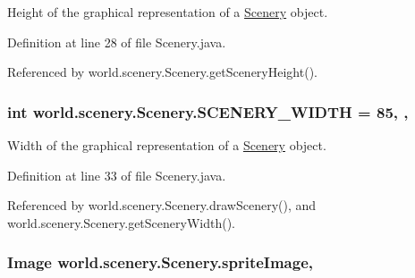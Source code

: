 Height of the graphical representation of a \hyperlink{classworld_1_1scenery_1_1_scenery}{Scenery} object. 



Definition at line 28 of file Scenery.\-java.



Referenced by world.\-scenery.\-Scenery.\-get\-Scenery\-Height().

\hypertarget{classworld_1_1scenery_1_1_scenery_affb047c028883c6d069a03ef0f1caeb8}{
\subsubsection[{S\-C\-E\-N\-E\-R\-Y\-\_\-\-W\-I\-D\-T\-H}]{\setlength{\rightskip}{0pt plus 5cm}int world.\-scenery.\-Scenery.\-S\-C\-E\-N\-E\-R\-Y\-\_\-\-W\-I\-D\-T\-H = 85\hspace{0.3cm}{\ttfamily [static]}, {\ttfamily [protected]}, {\ttfamily [inherited]}}}\label{classworld_1_1scenery_1_1_scenery_affb047c028883c6d069a03ef0f1caeb8}


Width of the graphical representation of a \hyperlink{classworld_1_1scenery_1_1_scenery}{Scenery} object. 



Definition at line 33 of file Scenery.\-java.



Referenced by world.\-scenery.\-Scenery.\-draw\-Scenery(), and world.\-scenery.\-Scenery.\-get\-Scenery\-Width().

\hypertarget{classworld_1_1scenery_1_1_scenery_a512d9c0a154e6843389e343d80843326}{
\subsubsection[{sprite\-Image}]{\setlength{\rightskip}{0pt plus 5cm}Image world.\-scenery.\-Scenery.\-sprite\-Image\hspace{0.3cm}{\ttfamily [protected]}, {\ttfamily [inherited]}}}\label{classworld_1_1scenery_1_1_scenery_a512d9c0a154e6843389e343d80843326}


